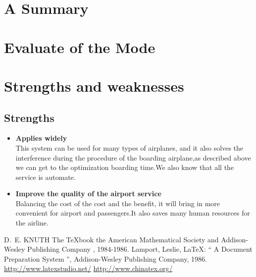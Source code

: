 \documentclass{mcmthesis}
\begin{document}
\section{A Summary}
\lipsum[6]

\section{Evaluate of the Mode}

\section{Strengths and weaknesses}
\lipsum[12]

\subsection{Strengths}
\begin{itemize}
\item \textbf{Applies widely}\\
This  system can be used for many types of airplanes, and it also
solves the interference during  the procedure of the boarding
airplane,as described above we can get to the  optimization
boarding time.We also know that all the service is automate.
\item \textbf{Improve the quality of the airport service}\\
Balancing the cost of the cost and the benefit, it will bring in
more convenient  for airport and passengers.It also saves many
human resources for the airline. 
\end{itemize}


\begin{thebibliography}{99}
 D.~E. KNUTH   The \TeX{}book  the American
Mathematical Society and Addison-Wesley
Publishing Company , 1984-1986.
Lamport, Leslie,  \LaTeX{}: `` A Document Preparation System '',
Addison-Wesley Publishing Company, 1986.
\url{http://www.latexstudio.net/}
\url{http://www.chinatex.org/}
\end{thebibliography}
\end{document}
